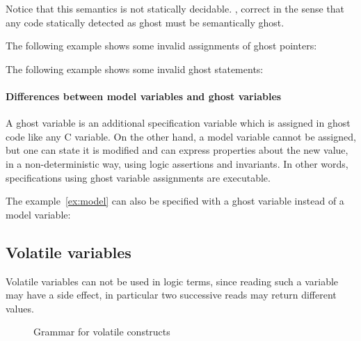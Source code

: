 Notice that this semantics is not statically decidable.
,
correct in the sense that any code
statically detected as ghost must be semantically ghost.

\begin{example}
  The following example shows some invalid assignments of ghost pointers:
\end{example}

\begin{example}
  The following example shows some invalid ghost statements:
\end{example}

\paragraph{Differences between model variables and ghost variables}

A ghost variable is an additional specification variable which is
assigned in ghost code like any C variable. On the other hand, a model
variable cannot be assigned, but one can state it is modified and can
express properties about the new value, in a non-deterministic way,
using logic assertions and invariants.
In other words, specifications using ghost variable assignments
are executable.

\begin{example}
  \label{ex:gen_code}
  The example~\ref{ex:model} can also be specified with a ghost
  variable instead of a model variable:


\end{example}

\subsection{Volatile variables}\label{sec:volatile-variables}

Volatile variables can not be used in logic terms, since reading such
a variable may have a side effect, in particular two successive reads
may return different values.

\begin{figure}[h]
  \begin{cadre}
      
    \end{cadre}
  \caption{Grammar for volatile constructs}
\label{fig:gram:volatile}
\end{figure}

